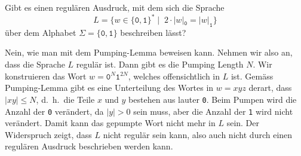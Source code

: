 Gibt es einen regulären Ausdruck, mit dem sich die Sprache
\[
L=\{
w\in\{\texttt{0},\texttt{1}\}^*
\;|\;\;
2\cdot|w|_{\texttt{0}}
=
|w|_{\texttt{1}}
\}
\]
über dem Alphabet $\Sigma=\{\texttt{0},\texttt{1}\}$ beschreiben lässt?

\begin{loesung}
Nein, wie man mit dem Pumping-Lemma beweisen kann.
Nehmen wir also an, dass die Sprache $L$ regulär ist.
Dann gibt es die Pumping Length $N$.
Wir konstruieren das Wort $w=\texttt{0}^N\texttt{1}^{2N}$, welches
offensichtlich in $L$ ist.
Gemäss Pumping-Lemma gibt es eine Unterteilung des Wortes in
$w=xyz$ derart, dass $|xy|\le N$, d.~h.~die Teile $x$ und $y$ bestehen
aus lauter \texttt{0}.
Beim Pumpen wird die Anzahl der \texttt{0} verändert, da $|y|>0$ sein
muss, aber die Anzahl der \texttt{1} wird nicht verändert.
Damit kann das gepumpte Wort nicht mehr in $L$ sein.
Der Widerspruch zeigt, dass $L$ nicht regulär sein kann, also auch nicht
durch einen regulären Ausdruck beschrieben werden kann.
\end{loesung}


